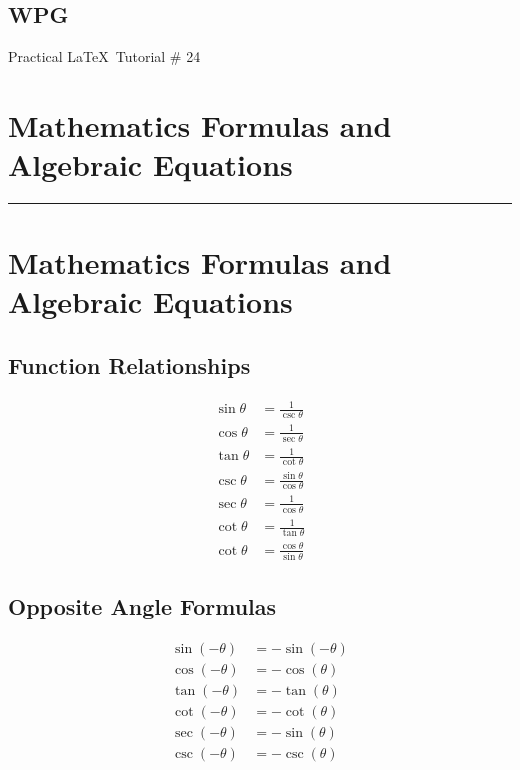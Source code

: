 \documentclass{article}
\begin{document}
	
	
	\begin{center}
		\section*{WPG}
		{\Large Practical \LaTeX\, Tutorial \# 24}
	\end{center}	
	\section*{Mathematics Formulas and Algebraic Equations}
	 
	\hrule
	\bigskip
	\bigskip
	\bigskip
	
	\section{Mathematics Formulas and Algebraic Equations}
	
	\subsection{Function Relationships}
	\begin{align*}
		\sin{\theta} &= \frac{1}{\csc{\theta}}\\
		\cos{\theta} &= \frac{1}{\sec{\theta}}\\
		\tan{\theta} &= \frac{1}{\cot{\theta}}\\
		\csc{\theta} &= \frac{\sin{\theta}}{\cos{\theta}}\\
		\sec{\theta} &= \frac{1}{\cos{\theta}}\\
		\cot{\theta} &= \frac{1}{\tan{\theta}}\\
		\cot{\theta} &= \frac{\cos{\theta}}{\sin{\theta}}
	\end{align*}
	
	
	\subsection{Opposite Angle Formulas}	
	\begin{align*}
		\sin{(-\theta)} &= -\sin{(-\theta)}\\
		\cos{(-\theta)} &= -\cos{(\theta)}\\		
		\tan{(-\theta)} &= -\tan{(\theta)}\\
		\cot{(-\theta)} &= -\cot{(\theta)}\\
		\sec{(-\theta)} &= -\sin{(\theta)}\\		
		\csc{(-\theta)} &= -\csc{(\theta)}
	\end{align*}
	
\end{document}
